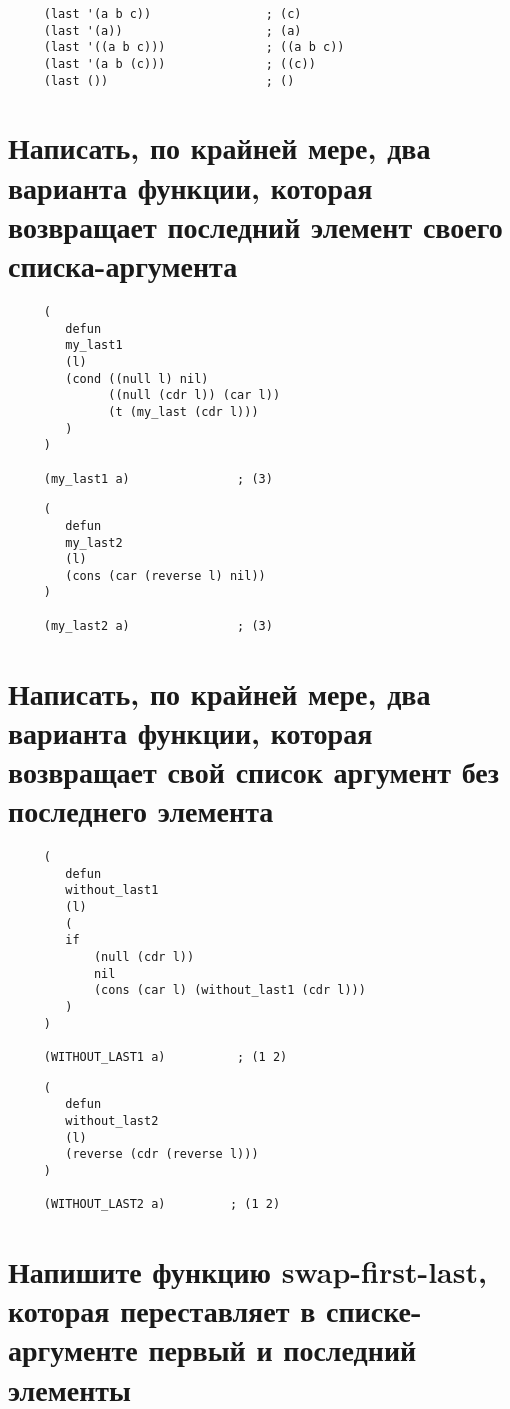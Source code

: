 \begin{lstlisting}
     (last '(a b c))                ; (c)
     (last '(a))                    ; (a)
     (last '((a b c)))              ; ((a b c))
     (last '(a b (c)))              ; ((c))
     (last ())                      ; ()
\end{lstlisting}

\section{Написать, по крайней мере, два варианта функции, которая возвращает последний элемент своего списка-аргумента}

\begin{lstlisting}
     (
        defun
        my_last1
        (l)
        (cond ((null l) nil)
              ((null (cdr l)) (car l))
              (t (my_last (cdr l)))
        )
     )

     (my_last1 a)               ; (3)
\end{lstlisting}

\begin{lstlisting}
     (
        defun
        my_last2
        (l)
        (cons (car (reverse l) nil))
     )

     (my_last2 a)               ; (3)
\end{lstlisting}

\section{Написать, по крайней мере, два варианта функции, которая возвращает свой список аргумент без последнего элемента}

\begin{lstlisting}
     (
        defun
        without_last1
        (l)
        (
        if 
            (null (cdr l))
            nil
            (cons (car l) (without_last1 (cdr l)))
        )
     )

     (WITHOUT_LAST1 a)          ; (1 2)
\end{lstlisting}

\begin{lstlisting}
     (
        defun
        without_last2
        (l)
        (reverse (cdr (reverse l)))
     )

     (WITHOUT_LAST2 a)         ; (1 2)
\end{lstlisting}

\section{Напишите функцию swap-first-last, которая переставляет в списке-аргументе первый и последний элементы}

